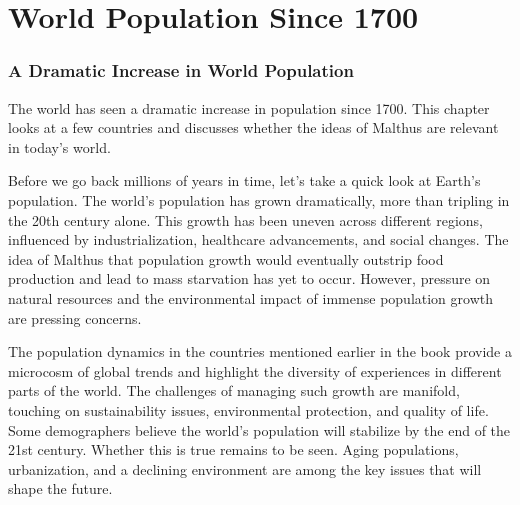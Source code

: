 \documentclass[a4paper,12pt]{book}
\newcommand{\inputtoc}[1]{}
\begin{document}
\chapter{World Population Since 1700}
\subsection*{A Dramatic Increase in World Population}
The world has seen a dramatic increase in population since 1700. This chapter looks at a few countries and discusses whether the ideas of Malthus are relevant in today's world.

\let\oldsection\section
\renewcommand{\section}[1]{\oldsection*{#1}\addcontentsline{toc}{section}{#1}}



Before we go back millions of years in time, let's take a quick look at Earth's population. The world's population has grown dramatically, more than tripling in the 20th century alone. This growth has been uneven across different regions, influenced by industrialization, healthcare advancements, and social changes. The idea of Malthus that population growth would eventually outstrip food production and lead to mass starvation has yet to occur. However, pressure on natural resources and the environmental impact of immense population growth are pressing concerns.

\inputtoc{england.tex}
\inputtoc{germany.tex}
\inputtoc{turkey.tex}
\inputtoc{SouthAfrica.tex}
\inputtoc{brazil.tex}
\inputtoc{russia.tex}
\inputtoc{australia.tex}
\inputtoc{korea.tex}
\inputtoc{japan.tex}
\inputtoc{indonesia.tex}
\inputtoc{india.tex}
\inputtoc{china.tex}
\inputtoc{mexico.tex}
\inputtoc{canada.tex}
\inputtoc{usa.tex}

\let\section\oldsection

The population dynamics in the countries mentioned earlier in the book provide a microcosm of global trends and highlight the diversity of experiences in different parts of the world. The challenges of managing such growth are manifold, touching on sustainability issues, environmental protection, and quality of life. Some demographers believe the world's population will stabilize by the end of the 21st century. Whether this is true remains to be seen. Aging populations, urbanization, and a declining environment are among the key issues that will shape the future. 
\end{document}
